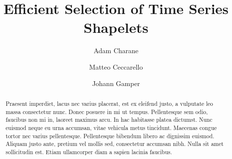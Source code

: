 \documentclass[sigconf, nonacm]{acmart}
\begin{document}
\title{Efficient Selection of Time Series Shapelets}

\author{Adam Charane}

\author{Matteo Ceccarello}

\author{Johann Gamper}

\begin{abstract}
	Praesent imperdiet, lacus nec varius placerat, est ex eleifend justo, a vulputate leo massa consectetur nunc. Donec posuere in mi ut tempus. Pellentesque sem odio, faucibus non mi in, laoreet maximus arcu. In hac habitasse platea dictumst. Nunc euismod neque eu urna accumsan, vitae vehicula metus tincidunt. Maecenas congue tortor nec varius pellentesque. Pellentesque bibendum libero ac dignissim euismod. Aliquam justo ante, pretium vel mollis sed, consectetur accumsan nibh. Nulla sit amet sollicitudin est. Etiam ullamcorper diam a sapien lacinia faucibus.
\end{abstract}

\maketitle
\end{document}
